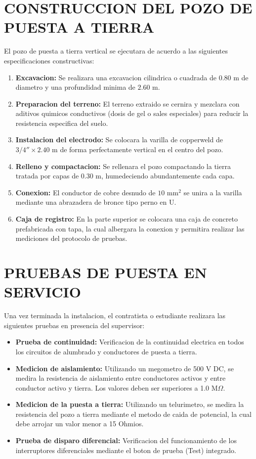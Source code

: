 \section{CONSTRUCCION DEL POZO DE PUESTA A TIERRA}

El pozo de puesta a tierra vertical se ejecutara de acuerdo a las siguientes especificaciones constructivas:
\begin{enumerate}
  \item \textbf{Excavacion:} Se realizara una excavacion cilindrica o cuadrada de \(0.80\text{ m}\) de diametro y una profundidad minima de \(2.60\text{ m}\).
  \item \textbf{Preparacion del terreno:} El terreno extraido se cernira y mezclara con aditivos quimicos conductivos (dosis de gel o sales especiales) para reducir la resistencia especifica del suelo.
  \item \textbf{Instalacion del electrodo:} Se colocara la varilla de copperweld de \(3/4'' \times 2.40\text{ m}\) de forma perfectamente vertical en el centro del pozo.
  \item \textbf{Relleno y compactacion:} Se rellenara el pozo compactando la tierra tratada por capas de \(0.30\text{ m}\), humedeciendo abundantemente cada capa.
  \item \textbf{Conexion:} El conductor de cobre desnudo de \(10\text{ mm}^2\) se unira a la varilla mediante una abrazadera de bronce tipo perno en U.
  \item \textbf{Caja de registro:} En la parte superior se colocara una caja de concreto prefabricada con tapa, la cual albergara la conexion y permitira realizar las mediciones del protocolo de pruebas.
\end{enumerate}

\section{PRUEBAS DE PUESTA EN SERVICIO}

Una vez terminada la instalacion, el contratista o estudiante realizara las siguientes pruebas en presencia del supervisor:
\begin{itemize}
  \item \textbf{Prueba de continuidad:} Verificacion de la continuidad electrica en todos los circuitos de alumbrado y conductores de puesta a tierra.
  \item \textbf{Medicion de aislamiento:} Utilizando un megometro de 500 V DC, se medira la resistencia de aislamiento entre conductores activos y entre conductor activo y tierra. Los valores deben ser superiores a 1.0 M\(\Omega\).
  \item \textbf{Medicion de la puesta a tierra:} Utilizando un telurimetro, se medira la resistencia del pozo a tierra mediante el metodo de caida de potencial, la cual debe arrojar un valor menor a 15 Ohmios.
  \item \textbf{Prueba de disparo diferencial:} Verificacion del funcionamiento de los interruptores diferenciales mediante el boton de prueba (Test) integrado.
\end{itemize}
